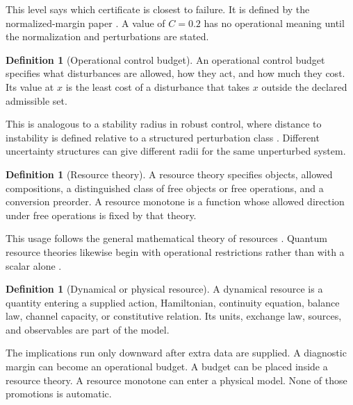 \documentclass[11pt]{article}
\theoremstyle{definition}
\newtheorem{definition}[theorem]{Definition}
\theoremstyle{remark}
\begin{document}
This level says which certificate is closest to failure.  It is defined by
the normalized-margin paper \cite{CapacityMargin2026}.  A value of
\(C=0.2\) has no operational meaning until the normalization and
perturbations are stated.

\begin{definition}[Operational control budget]
An operational control budget specifies what disturbances are allowed, how
they act, and how much they cost.  Its value at \(x\) is the least cost of a
disturbance that takes \(x\) outside the declared admissible set.
\end{definition}

This is analogous to a stability radius in robust control, where distance
to instability is defined relative to a structured perturbation class
\cite{HinrichsenPritchard1986}.  Different uncertainty structures can give
different radii for the same unperturbed system.

\begin{definition}[Resource theory]
A resource theory specifies objects, allowed compositions, a distinguished
class of free objects or free operations, and a conversion preorder.  A
resource monotone is a function whose allowed direction under free
operations is fixed by that theory.
\end{definition}

This usage follows the general mathematical theory of resources
\cite{CoeckeFritzSpekkens2016}.  Quantum resource theories likewise begin
with operational restrictions rather than with a scalar alone
\cite{ChitambarGour2019}.

\begin{definition}[Dynamical or physical resource]
A dynamical resource is a quantity entering a supplied action, Hamiltonian,
continuity equation, balance law, channel capacity, or constitutive
relation.  Its units, exchange law, sources, and observables are part of the
model.
\end{definition}

The implications run only downward after extra data are supplied.  A
diagnostic margin can become an operational budget.  A budget can be placed
inside a resource theory.  A resource monotone can enter a physical model.
None of those promotions is automatic.
\end{document}

